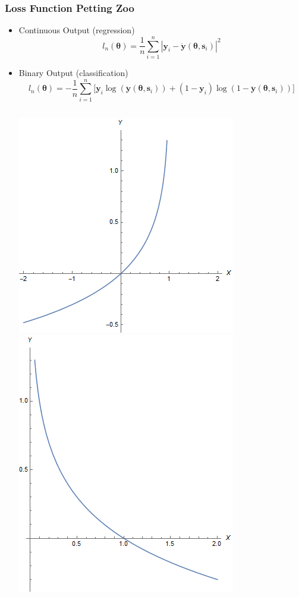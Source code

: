 \documentclass[pdf]{beamer}
\begin{document}
\begin{frame}
  \frametitle{Loss Function Petting Zoo}
  \begin{itemize}
  \item Continuous Output (regression)
    \[ l_n(\boldsymbol{\theta}) = \frac{1}{n}\sum_{i=1}^{n} |\boldsymbol{y}_i
      -\boldsymbol{\ddot{y}}(\boldsymbol{\theta},\boldsymbol{s}_i)|^2
    \]
  \item Binary Output (classification)
    \[ l_n(\boldsymbol{\theta}) = -\frac{1}{n}\sum_{i=1}^{n}
      \big[\boldsymbol{y}_i\log(\ddot{\boldsymbol{y}}(\boldsymbol{\theta},\boldsymbol{s}_i))
      + (1-\boldsymbol{y}_i)\log(1-\ddot{\boldsymbol{y}}(\boldsymbol{\theta},\boldsymbol{s}_i))\big]
    \]
    \begin{columns}
      \includegraphics[scale=0.20]{-logx.png}
      \includegraphics[scale=0.17]{-log1-x.png}
    \end{columns}
  \end{itemize}
\end{frame}
\end{document}

